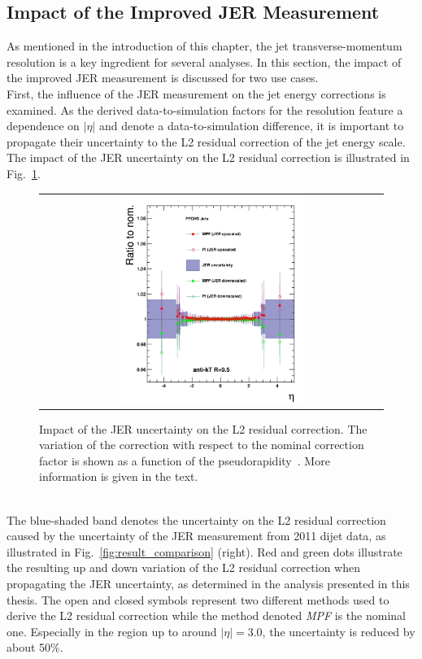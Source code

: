 \subsection{Impact of the Improved JER Measurement}
\label{subsec:jer_results_impact}
As mentioned in the introduction of this chapter, the jet transverse-momentum resolution is a key ingredient for several analyses. In this section, the impact of the improved JER measurement is discussed for two use cases. \\
First, the influence of the JER measurement on the jet energy corrections is examined. As the derived data-to-simulation factors for the resolution feature a dependence on $|\eta|$ and denote a data-to-simulation difference, it is important to propagate their uncertainty to the L2 residual correction of the jet energy scale. The impact of the JER uncertainty on the L2 residual correction is illustrated in Fig.~\ref{fig:result_jec_impact}.  
\begin{figure}[!h]
  \centering
  \begin{tabular}{c}
                \includegraphics[width=0.55\textwidth]{figures/newJER_L2V4_L3fixed-ratio_mod.jpg} 
  \end{tabular}
  \caption{Impact of the JER uncertainty on the L2 residual correction. The variation of the correction with respect to the nominal correction factor is shown as a function of the pseudorapidity~\cite{DRathjens}. More information is given in the text.}
  \label{fig:result_jec_impact}
\end{figure}
\\
The blue-shaded band denotes the uncertainty on the L2 residual correction caused by the uncertainty of the JER measurement from 2011 dijet data, as illustrated in Fig.~\ref{fig:result_comparison} (right). Red and green dots illustrate the resulting up and down variation of the L2 residual correction when propagating the JER uncertainty, as determined in the analysis presented in this thesis. The open and closed symbols represent two different methods used to derive the L2 residual correction while the method denoted \textit{MPF} is the nominal one. Especially in the region up to around $|\eta| = 3.0$, the uncertainty is reduced by about 50\%. 
